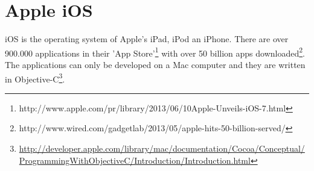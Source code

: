 \section{Apple iOS}
iOS is the operating system of Apple's iPad, iPod an iPhone. There are over 900.000 applications in their 'App Store'\footnote{http://www.apple.com/pr/library/2013/06/10Apple-Unveils-iOS-7.html} with over 50 billion apps downloaded\footnote{http://www.wired.com/gadgetlab/2013/05/apple-hits-50-billion-served/}. The applications can only be developed on a Mac computer and they are written in Objective-C\footnote{\url{http://developer.apple.com/library/mac/documentation/Cocoa/Conceptual/ProgrammingWithObjectiveC/Introduction/Introduction.html}}.
